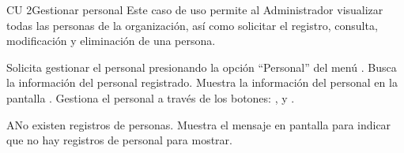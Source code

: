\begin{UseCase}{CU 2}{Gestionar personal}
	{
		Este caso de uso permite al Administrador visualizar todas las personas de la organización, así como solicitar el registro, consulta, modificación y eliminación de una persona.
	}
	
	

	


\end{UseCase}
 \begin{UCtrayectoria}
    \UCpaso[\UCactor] Solicita gestionar el personal presionando la opción ``Personal'' del menú .
    \UCpaso[\UCsist] Busca la información del personal registrado. 
    \UCpaso[\UCsist] Muestra la información del personal en la pantalla .
    \UCpaso[\UCactor] Gestiona el personal a través de los botones: , \btnEditar y \btnEliminar. \label{cu2:gestiona}
 \end{UCtrayectoria}
 
 \begin{UCtrayectoriaA}{A}{No existen registros de personas.}
    \UCpaso[\UCsist] Muestra el mensaje  en pantalla  
    para indicar que no hay registros de personal para mostrar.
 \end{UCtrayectoriaA}
 

